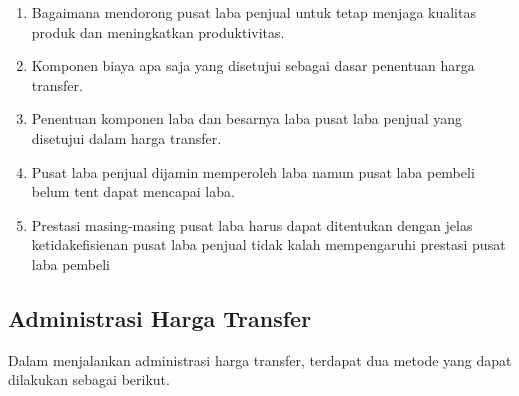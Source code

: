 \begin{enumerate}
	\begin{enumerate}
		\item Bagaimana mendorong pusat laba penjual untuk tetap menjaga kualitas produk dan meningkatkan produktivitas.
		\item Komponen biaya apa saja yang disetujui sebagai dasar penentuan harga transfer.
		\item Penentuan komponen laba dan besarnya laba pusat laba penjual yang disetujui dalam harga transfer.
		\item Pusat laba penjual dijamin memperoleh laba namun pusat laba pembeli belum tent dapat mencapai laba.
		\item Prestasi masing-masing pusat laba harus dapat ditentukan dengan jelas ketidakefisienan pusat laba penjual tidak kalah mempengaruhi prestasi pusat laba pembeli
	\end{enumerate}

\end{enumerate}

\subsection{Administrasi Harga Transfer}

	Dalam menjalankan administrasi harga transfer, terdapat dua metode yang dapat dilakukan sebagai berikut.


